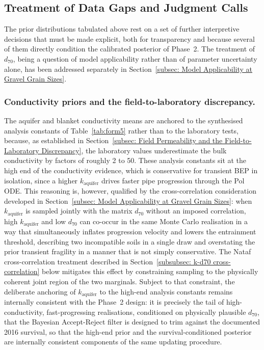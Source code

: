 \subsection{Treatment of Data Gaps and Judgment Calls}
\label{subsec: Treatment of Data Gaps and Judgment Calls}

The prior distributions tabulated above rest on a set of further interpretive decisions that must be made explicit, both for transparency and because several of them directly condition the calibrated posterior of Phase~2. The treatment of $d_{70}$, being a question of model applicability rather than of parameter uncertainty alone, has been addressed separately in Section~\ref{subsec: Model Applicability at Gravel Grain Sizes}.

\subsubsection*{Conductivity priors and the field-to-laboratory discrepancy.}
The aquifer and blanket conductivity means are anchored to the synthesised analysis constants of Table~\ref{tab:form5} rather than to the laboratory tests, because, as established in Section~\ref{subsec: Field Permeability and the Field-to-Laboratory Discrepancy}, the laboratory values underestimate the bulk conductivity by factors of roughly 2 to 50. These analysis constants sit at the high end of the conductivity evidence, which is conservative for transient BEP in isolation, since a higher $k_\mathrm{aquifer}$ drives faster pipe progression through the Pol ODE. This reasoning is, however, qualified by the cross-correlation consideration developed in Section~\ref{subsec: Model Applicability at Gravel Grain Sizes}: when $k_\mathrm{aquifer}$ is sampled jointly with the matrix $d_{70}$ without an imposed correlation, high $k_\mathrm{aquifer}$ and low $d_{70}$ can co-occur in the same Monte Carlo realisation in a way that simultaneously inflates progression velocity and lowers the entrainment threshold, describing two incompatible soils in a single draw and overstating the prior transient fragility in a manner that is not simply conservative. The Nataf cross-correlation treatment described in Section~\ref{subsubsec: k-d70 cross-correlation} below mitigates this effect by constraining sampling to the physically coherent joint region of the two marginals. Subject to that constraint, the deliberate anchoring of $k_\mathrm{aquifer}$ to the high-end analysis constants remains internally consistent with the Phase~2 design: it is precisely the tail of high-conductivity, fast-progressing realisations, conditioned on physically plausible $d_{70}$, that the Bayesian Accept-Reject filter is designed to trim against the documented 2016 survival, so that the high-end prior and the survival-conditioned posterior are internally consistent components of the same updating procedure.

